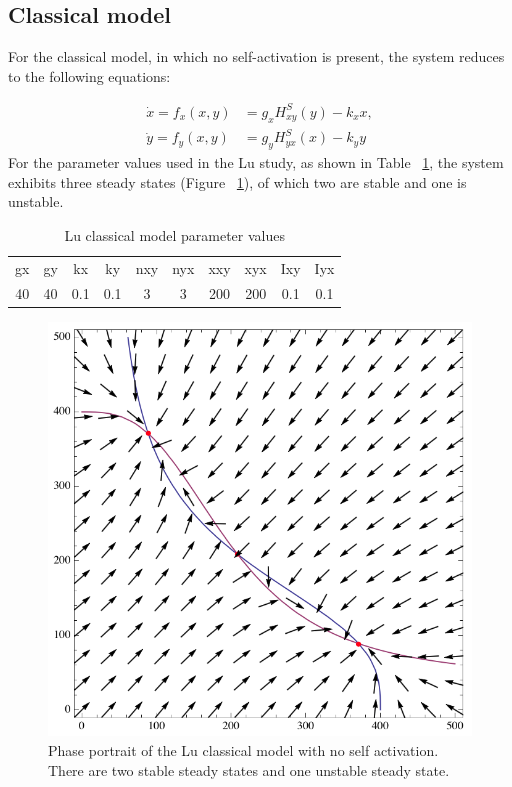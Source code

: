 \clearpage

\subsection{Classical model}
For the classical model, in which no self-activation is present, the system reduces to the following equations:

\begin{align}
\dot{x}=f_{x}(x,y) &= g_{x}H^{S}_{xy}(y)-k_{x}x,\label{eq:lu_cl_1}\\
\dot{y}=f_{y}(x,y) &= g_{y}H^{S}_{yx}(x)-k_{y}y\label{eq:lu_cl_2}
\end{align}
For the parameter values used in the Lu study, as shown in Table ~\ref{tab:lu_cl_bi}, the system exhibits three steady states (Figure ~\ref{fig:lu_bis_class}), of which two are stable and one is unstable. 

\begin{table}[htbp]
\centering
\caption{Lu classical model parameter values}
\label{tab:lu_cl_bi}
\begin{tabular}{cccccccccc}
gx    & gy    & kx    & ky    & nxy & nyx & xxy     & xyx     & Ixy   & Iyx \\
40&40     &0.1   & 0.1   &  3  &  3  &  200    &  200    & 0.1    &   0.1
\end{tabular}
\end{table}

\begin{figure}[htbp]
\centering
\includegraphics[scale=0.4]{chapterModelling/Lu_switches/images/mae/classical_bistable.png}
\caption[Phase portrait of the Lu classical model with no self activation]{Phase portrait of the Lu classical model with no self activation. There are two stable steady states and one unstable steady state.}
\label{fig:lu_bis_class}
\end{figure}


